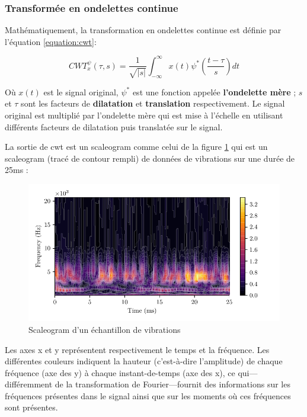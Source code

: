 \subsubsection{Transformée en ondelettes continue}
Mathématiquement, la transformation en ondelettes continue est définie par l'équation \ref{equation:cwt}:

\begin{equation}
    CWT_x^\psi(\tau, s)=\frac{1}{\sqrt{|s|}}\int_{-\infty}^{\infty}x(t)\psi^* \left(\frac{t-\tau}{s}\right)dt
    \label{equation:cwt}
\end{equation}

Où $x(t)$ est le signal original, $\psi^*$ est une fonction appelée \textbf{l'ondelette mère} ; $s$ et $\tau$ sont les facteurs de \textbf{dilatation} et \textbf{translation} respectivement. Le signal original est multiplié par l'ondelette mère qui est mise à l'échelle en utilisant différents facteurs de dilatation puis translatée sur le signal.

La sortie de \acrshort{cwt} est un scaleogram comme celui de la figure \ref{fig:scaleogram} qui est un scaleogram (tracé de contour rempli) de données de vibrations sur une durée de 25ms :

\begin{figure}[H]
    \centering
    \includegraphics{figures/scaleogram.pdf}
    \caption{Scaleogram d'un échantillon de vibrations}
    \label{fig:scaleogram}
\end{figure}

Les axes x et y représentent respectivement le temps et la fréquence. Les différentes couleurs indiquent la hauteur (c'est-à-dire l'amplitude) de chaque fréquence (axe des y) à chaque instant-de-temps (axe des x), ce qui—différemment de la transformation de Fourier—fournit des informations sur les fréquences présentes dans le signal ainsi que sur les moments où ces fréquences sont présentes.

